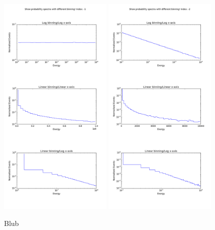 \begin{appendices}
\begin{figure}
\centering
\includegraphics[width=0.48\textwidth]{appendix/img/probabilitypowerlaw_index1}
\includegraphics[width=0.48\textwidth]{appendix/img/probabilitypowerlaw_index2}
\caption{Blub}
\label{fig:powerlawrandom}
\end{figure}


\end{appendices}
